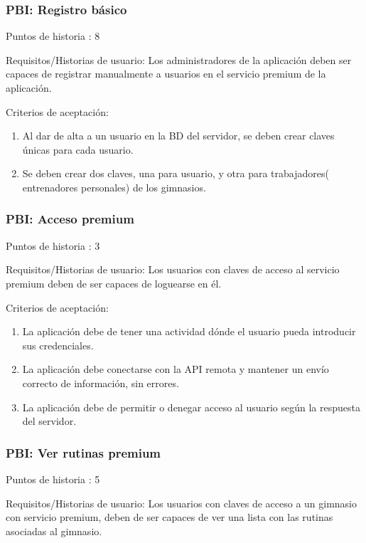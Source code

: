 \documentclass[11pt,a4paper]{report}
\begin{document}
\subsubsection{PBI: Registro básico}
Puntos de historia : 8

Requisitos/Historias de usuario: Los administradores de la aplicación deben ser capaces de registrar manualmente a usuarios en el servicio premium de la aplicación.

Criterios de aceptación:
\begin{enumerate}
	\item Al dar de alta a un usuario en la BD del servidor, se deben crear claves únicas para cada usuario.
	
	\item Se deben crear dos claves, una para usuario, y otra para trabajadores( entrenadores personales) de los gimnasios.
	
\end{enumerate}
\subsubsection{PBI: Acceso premium}
Puntos de historia : 3

Requisitos/Historias de usuario: Los usuarios con claves de acceso al servicio premium deben de ser capaces de loguearse en él.

Criterios de aceptación:
\begin{enumerate}
	\item La aplicación debe de tener una actividad dónde el usuario pueda introducir sus credenciales.
	
	\item La aplicación debe conectarse con la API remota y mantener un envío correcto de información, sin errores.
	
	\item La aplicación debe de permitir o denegar acceso al usuario según la respuesta del servidor.
	
\end{enumerate}
\subsubsection{PBI: Ver rutinas premium}
Puntos de historia : 5

Requisitos/Historias de usuario: Los usuarios con claves de acceso a un gimnasio con servicio premium, deben de ser capaces de ver una lista con las rutinas asociadas al gimnasio.
\end{document}
